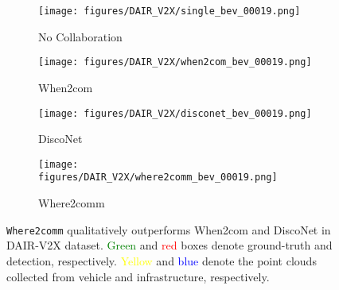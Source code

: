 \documentclass{article}
\begin{document}
\begin{figure}
    \centering
  \begin{subfigure}{0.24\linewidth}
    \texttt{[image: figures/DAIR\_V2X/single\_bev\_00019.png]}
\caption{No Collaboration}
    \label{fig:no_comm}
  \end{subfigure}
\begin{subfigure}{0.24\linewidth}
    \texttt{[image: figures/DAIR\_V2X/when2com\_bev\_00019.png]}
\caption{When2com}
    \label{fig:when2com}
  \end{subfigure}
  \begin{subfigure}{0.24\linewidth}
    \texttt{[image: figures/DAIR\_V2X/disconet\_bev\_00019.png]}
    \caption{DiscoNet}
    \label{fig:disconet}
  \end{subfigure}
  \begin{subfigure}{0.24\linewidth}
    \texttt{[image: figures/DAIR\_V2X/where2comm\_bev\_00019.png]}
    \caption{Where2comm}
    \label{fig:where2comm}
  \end{subfigure}
  \vspace{-2mm}
    \caption{\texttt{Where2comm} qualitatively outperforms When2com and DiscoNet in DAIR-V2X dataset. \textcolor{green}{Green} and \textcolor{red}{red} boxes denote ground-truth and detection, respectively. \textcolor{yellow}{Yellow} and \textcolor{blue}{blue} denote the point clouds collected from vehicle and infrastructure, respectively. }
    \label{fig:dairdetections}
    \vspace{-4mm}
\end{figure}
\end{document}
